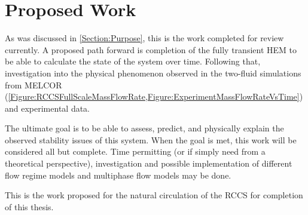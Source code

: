 \clearpage
\section{Proposed Work}
As was discussed in \cref{Section:Purpose}, this is the work completed for review currently.
A proposed path forward is completion of the fully transient HEM to be able to calculate the state of the system over time.
Following that, investigation into the physical phenomenon observed in the two-fluid simulations from MELCOR (\cref{Figure:RCCSFullScaleMassFlowRate,Figure:ExperimentMassFlowRateVsTime}) and experimental data.

The ultimate goal is to be able to assess, predict, and physically explain the observed stability issues of this  system.
When the goal is met, this work will be considered all but complete.
Time permitting (or if simply need from a theoretical perspective), investigation and possible implementation of different flow regime models and multiphase flow models may be done.

This is the work proposed for the natural circulation of the RCCS for completion of this thesis.



